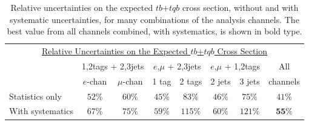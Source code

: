 \vspace{-0.1in}
\begin{table}[!h!tbp]
\begin{center}
\begin{minipage}{5in}
\begin{ruledtabular}
\begin{tabular}{l|cc|cc|cc|c}
  \multicolumn{8}{c}{\hspace{0.5in}\underline{Relative Uncertainties on the Expected $tb$+$tqb$ Cross Section}}\vspace{0.1in}\\
& \multicolumn{2}{c|}{1,2tags + 2,3jets}& \multicolumn{2}{c|}{$e$,$\mu$ + 2,3jets}
& \multicolumn{2}{c|}{$e$,$\mu$ + 1,2tags}& All \\
                 &  $e$-chan & $\mu$-chan& 1 tag & 2 tags& 2 jets& 3 jets&channels\\
\hline
Statistics only  &  $52\%$  & $60\%$ & $45\%$ & $83\%$  &  $46\%$  & $75\%$  & $41\%$     \\
With systematics &  $67\%$  & $75\%$ & $59\%$ & $115\%$ &  $60\%$  & $121\%$ & $\mathbf{55\%}$     \\
\end{tabular}
\end{ruledtabular}
\vspace{-0.1in}
\caption[exp-errors]{Relative uncertainties on the expected
$tb$+$tqb$ cross section, without and with systematic uncertainties,
for many combinations of the analysis channels. The best value from
all channels combined, with systematics, is shown in bold type.}
\label{exp-errors}
\end{minipage}
\end{center}
\end{table}


